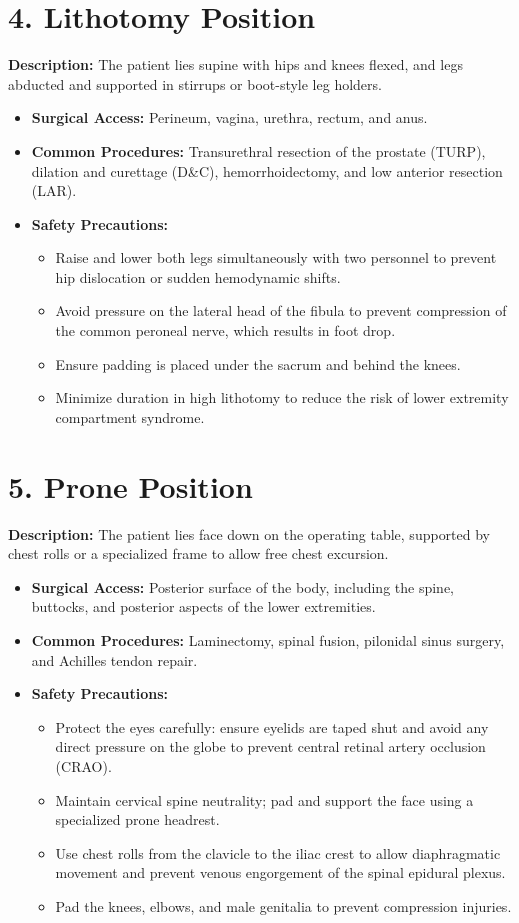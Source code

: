\section*{4. Lithotomy Position}
\textbf{Description:} The patient lies supine with hips and knees flexed, and legs abducted and supported in stirrups or boot-style leg holders.
\begin{itemize}
  \item \textbf{Surgical Access:} Perineum, vagina, urethra, rectum, and anus.
  \item \textbf{Common Procedures:} Transurethral resection of the prostate (TURP), dilation and curettage (D\&C), hemorrhoidectomy, and low anterior resection (LAR).
  \item \textbf{Safety Precautions:}
  \begin{itemize}
    \item Raise and lower both legs simultaneously with two personnel to prevent hip dislocation or sudden hemodynamic shifts.
    \item Avoid pressure on the lateral head of the fibula to prevent compression of the common peroneal nerve, which results in foot drop.
    \item Ensure padding is placed under the sacrum and behind the knees.
    \item Minimize duration in high lithotomy to reduce the risk of lower extremity compartment syndrome.
  \end{itemize}
\end{itemize}

\section*{5. Prone Position}
\textbf{Description:} The patient lies face down on the operating table, supported by chest rolls or a specialized frame to allow free chest excursion.
\begin{itemize}
  \item \textbf{Surgical Access:} Posterior surface of the body, including the spine, buttocks, and posterior aspects of the lower extremities.
  \item \textbf{Common Procedures:} Laminectomy, spinal fusion, pilonidal sinus surgery, and Achilles tendon repair.
  \item \textbf{Safety Precautions:}
  \begin{itemize}
    \item Protect the eyes carefully: ensure eyelids are taped shut and avoid any direct pressure on the globe to prevent central retinal artery occlusion (CRAO).
    \item Maintain cervical spine neutrality; pad and support the face using a specialized prone headrest.
    \item Use chest rolls from the clavicle to the iliac crest to allow diaphragmatic movement and prevent venous engorgement of the spinal epidural plexus.
    \item Pad the knees, elbows, and male genitalia to prevent compression injuries.
  \end{itemize}
\end{itemize}

